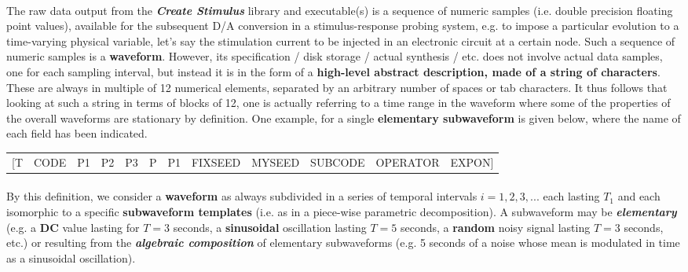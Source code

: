 \paragraph{}
The raw data output from the \textbf{\textit{Create Stimulus}} library and executable(s) is a sequence of numeric
samples (i.e. double precision floating point values), available for the subsequent D/A conversion in a
stimulus-response probing system, e.g. to impose a particular evolution to a time-varying physical variable, let's say
the stimulation current to be injected in an electronic circuit at a certain node. Such a sequence of numeric samples
is a \textbf{waveform}. However, its specification / disk storage / actual synthesis / etc. does not involve actual
data samples, one for each sampling interval, but instead it is in the form of a \textbf{high-level abstract
description, made of a string of characters}. These are always in multiple of 12 numerical elements, separated by an
arbitrary number of spaces or tab characters. It thus follows that looking at such a string in terms of blocks of 12,
one is actually referring to a time range in the waveform where some of the properties of the overall waveforms are
stationary by definition. One example, for a single \textbf{elementary subwaveform} is given below, where the name of
each field has been indicated.

\begin{center}
\footnotesize\ttfamily
\begin{tabular}{rrrrrrrrrrrr}
[T & CODE & P1 & P2 & P3 & P & P1 & FIXSEED & MYSEED & SUBCODE & OPERATOR & EXPON]
\end{tabular}
\end{center}
	
\paragraph{}
By this definition, we consider a \textbf{waveform} as always subdivided in a series of temporal intervals $i=1,2,3,...$
each lasting \textbf{$T_1$} and each isomorphic to a specific \textbf{subwaveform templates} 
(i.e. as in a piece-wise parametric decomposition). A subwaveform may be \textbf{\textit{elementary}} (e.g. a
\textbf{DC} value lasting for \textbf{$T=3$} seconds, a \textbf{sinusoidal} oscillation
lasting \textbf{$T=5$} seconds, a \textbf{random} noisy signal lasting
\textbf{$T=3$} seconds, etc.) or resulting from the \textbf{\textit{algebraic composition}} of
elementary subwaveforms (e.g. 5 seconds of a noise whose mean is modulated in time as a sinusoidal oscillation).


